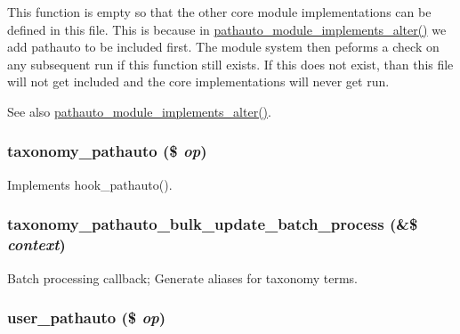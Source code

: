 This function is empty so that the other core module implementations can be defined in this file. This is because in \hyperlink{pathauto_8module_aaf87f3ee5c92db465e39a83dafc7e470}{pathauto\_\-module\_\-implements\_\-alter()} we add pathauto to be included first. The module system then peforms a check on any subsequent run if this function still exists. If this does not exist, than this file will not get included and the core implementations will never get run.

\begin{DoxySeeAlso}{See also}
\hyperlink{pathauto_8module_aaf87f3ee5c92db465e39a83dafc7e470}{pathauto\_\-module\_\-implements\_\-alter()}. 
\end{DoxySeeAlso}
\hypertarget{pathauto_8pathauto_8inc_a80b05ba65dfad90d0c849673546736a1}{
\subsubsection[{taxonomy\_\-pathauto}]{\setlength{\rightskip}{0pt plus 5cm}taxonomy\_\-pathauto (\$ {\em op})}}
\label{pathauto_8pathauto_8inc_a80b05ba65dfad90d0c849673546736a1}
Implements hook\_\-pathauto(). \hypertarget{pathauto_8pathauto_8inc_a4ec3b6632264545aac8916614811ca0d}{
\subsubsection[{taxonomy\_\-pathauto\_\-bulk\_\-update\_\-batch\_\-process}]{\setlength{\rightskip}{0pt plus 5cm}taxonomy\_\-pathauto\_\-bulk\_\-update\_\-batch\_\-process (\&\$ {\em context})}}
\label{pathauto_8pathauto_8inc_a4ec3b6632264545aac8916614811ca0d}
Batch processing callback; Generate aliases for taxonomy terms. \hypertarget{pathauto_8pathauto_8inc_a08bb0b4fe74c74a05ee0e56e7e9b8636}{
\subsubsection[{user\_\-pathauto}]{\setlength{\rightskip}{0pt plus 5cm}user\_\-pathauto (\$ {\em op})}}
